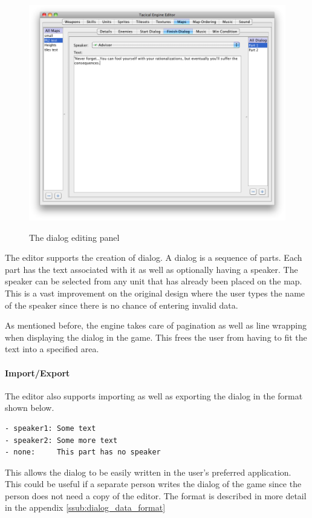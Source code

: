 \begin{figure}[htbp]
		\includegraphics[height=4in]{figures/editor/Maps-dialog.png}
	\caption{The dialog editing panel}
	\label{fig:figures_editor_Maps-dialog}
\end{figure}
The editor supports the creation of dialog.  A dialog is a sequence of parts. Each part has the text  associated with it as well as optionally having a speaker.  The speaker can be selected from any unit that has already been placed on the map. This is a vast improvement on the original design where the user types the name of the speaker since there is no chance of entering invalid data.

As mentioned before, the engine takes care of pagination as well as line wrapping when displaying the dialog in the game. This frees the user from having to fit the text into a specified area. 

\paragraph{Import/Export\\}
The editor also supports importing as well as exporting the dialog in the format shown below. 
\begin{lstlisting}[caption=Shows the format used  for the dialog]
- speaker1: Some text 
- speaker2: Some more text
- none:     This part has no speaker
\end{lstlisting}
This allows the dialog to be easily written in the user's preferred application.  This could be useful if a  separate person writes the dialog of the game since the person does not need a copy of the editor. The format is described in more detail in the appendix \ref{ssub:dialog_data_format}  

